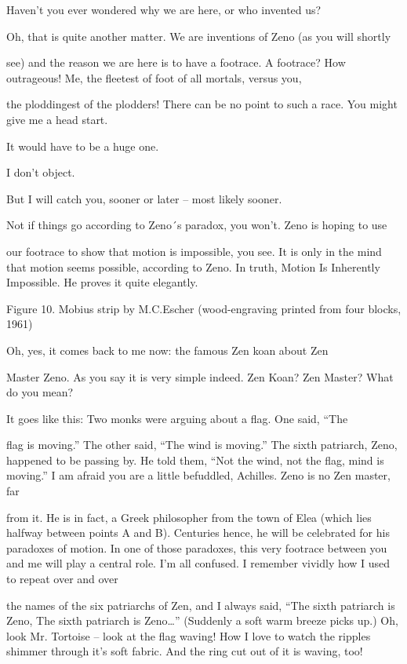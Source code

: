\achilles Haven’t you ever wondered why we are here, or who invented us?\par

\tortoise Oh, that is quite another matter. We are inventions of Zeno (as you will shortly\par
see) and the reason we are here is to have a footrace. 
\achilles A footrace? How outrageous! Me, the fleetest of foot of all mortals, versus you,\par
the ploddingest of the plodders! There can be no point to such a race. 
\tortoise You might give me a head start.\par

\achilles It would have to be a huge one.\par

\tortoise I don’t object.\par

\achilles But I will catch you, sooner or later – most likely sooner.\par

\tortoise Not if things go according to Zeno´s paradox, you won’t. Zeno is hoping to use\par
our footrace to show that motion is impossible, you see. It is only in the mind that motion seems possible, according to Zeno. In truth, Motion Is Inherently Impossible. He proves it quite elegantly. 







Figure 10. Mobius strip by M.C.Escher (wood-engraving printed from four blocks, 1961) 


\achilles Oh, yes, it comes back to me now: the famous Zen koan about Zen\par
Master Zeno. As you say it is very simple indeed. 
\tortoise Zen Koan? Zen Master? What do you mean?\par

\achilles It goes like this: Two monks were arguing about a flag. One said, “The\par
flag is moving.” The other said, “The wind is moving.” The sixth patriarch, Zeno, happened to be passing by. He told them, “Not the wind, not the flag, mind is moving.” 
\tortoise I am afraid you are a little befuddled, Achilles. Zeno is no Zen master, far\par
from it. He is in fact, a Greek philosopher from the town of Elea (which lies halfway between points A and B). Centuries hence, he will be celebrated for his paradoxes of motion. In one of those paradoxes, this very footrace between you and me will play a central role. 
\achilles I’m all confused. I remember vividly how I used to repeat over and over\par
the names of the six patriarchs of Zen, and I always said, “The sixth patriarch is Zeno, The sixth patriarch is Zeno…” (Suddenly a soft warm breeze picks up.) Oh, look Mr. Tortoise – look at the flag waving! How I love to watch the ripples shimmer through it’s soft fabric. And the ring cut out of it is waving, too! 






